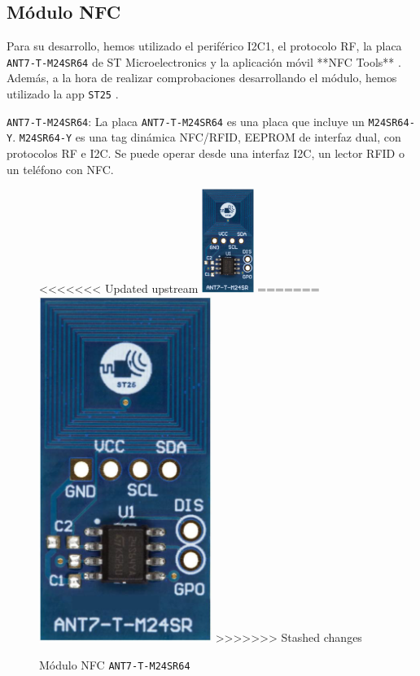 \subsection{Módulo NFC}

Para su desarrollo, hemos utilizado el periférico I2C1, el protocolo RF, la placa \texttt{ANT7-T-M24SR64} \cite{M24SR64YPagWeb} de ST Microelectronics y la aplicación móvil **NFC Tools** \cite{NFCTools}. Además, a la hora de realizar comprobaciones desarrollando el módulo, hemos utilizado la app \texttt{ST25} \cite{ST25}.

\texttt{ANT7-T-M24SR64}: 
La placa \texttt{ANT7-T-M24SR64} es una placa que incluye un \texttt{M24SR64-Y}. \texttt{M24SR64-Y} es una tag dinámica NFC/RFID, EEPROM de interfaz dual, con protocolos RF e I2C. Se puede operar desde una interfaz I2C, un lector RFID o un teléfono con NFC.

\begin{figure}[h]
    \centering
<<<<<<< Updated upstream
    \includegraphics[width=0.15\textwidth]{images/2/2-5/M24SR.png}
=======
    \includegraphics[width=0.5\textwidth]{images/2/2-5/M24SR.png}
>>>>>>> Stashed changes
    \caption{Módulo NFC \texttt{ANT7-T-M24SR64}}
    \label{fig:2-5-modulo-nfc}
\end{figure}

